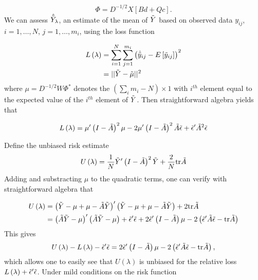 \begin{equation} 
\Phi = D^{-1/2} X \left[ Bd + Qc \right].
\end{equation}
\noindent
We can assess $\hat{\tilde{Y}}_\lambda$, an estimate of the mean of $\tilde{Y}$ based on observed data $y_{ij}$, $i = 1,\dots, N$, $j = 1,\dots, m_i$, using the loss function

\begin{align}
\begin{split}
L\left(\lambda\right) &= \sum_{i = 1}^N \sum_{j = 1}^{m_i} \left(\hat{\tilde{y}}_{ij} - E\left[\tilde{y}_{ij}\right] \right)^2\\
&= \vert \vert \tilde{Y} - \tilde{\mu} \vert \vert^2
\end{split}
\end{align}
\noindent
where $\mu = D^{-1/2}W \Phi^*$ denotes the $\left( \sum \limits_{i} m_i - N\right) \times 1$ with $i^{th}$ element equal to the expected value of the  $i^{th}$ element of $\tilde{Y}$.  Then straightforward algebra yields that 

\begin{align} 
L\left(\lambda\right) = \mu'\left( I - \tilde{A} \right)^2\mu - 2\mu'\left( I - \tilde{A} \right)^2 \tilde{A} \tilde{\epsilon} + \tilde{\epsilon}' \tilde{A}^2 \tilde{\epsilon}
\end{align}

Define the unbiased risk estimate
\begin{equation} 
U\left(\lambda\right) = \frac{1}{N}\tilde{Y}'\left( I - \tilde{A} \right)^2\tilde{Y} + \frac{2}{N}\mbox{tr}\tilde{A}
\end{equation}
 \noindent
Adding and substracting $\mu$ to the quadratic terms, one can verify with straightforward algebra that

\begin{align}
\begin{split}
U\left(\lambda\right) &= \left( \tilde{Y} - \mu + \mu - \tilde{A} \tilde{Y} \right)'\left( \tilde{Y} - \mu + \mu - \tilde{A} \tilde{Y} \right) + 2\mbox{tr}\tilde{A} \\
&= \left(\tilde{A} \tilde{Y} - \mu \right)'\left( \tilde{A} \tilde{Y} - \mu \right) + \tilde{\epsilon}'\tilde{\epsilon} + 2\tilde{\epsilon}' \left( I- \tilde{A}\right)\mu- 2\left( \tilde{\epsilon}'\tilde{A} \tilde{\epsilon} -  \mbox{tr}\tilde{A}\right)
\end{split}
\end{align}
\noindent
This gives
\begin{equation} 
U\left(\lambda\right) - L\left(\lambda\right) - \tilde{\epsilon}'\tilde{\epsilon}  =  2\tilde{\epsilon}' \left( I- \tilde{A}\right)\mu- 2\left( \tilde{\epsilon}'\tilde{A} \tilde{\epsilon} -  \mbox{tr}\tilde{A}\right), 
\end{equation}
 \noindent
 which allows one to easily see that $U\left(\lambda\right)$ is unbiased for the relative loss $L\left(\lambda\right) + \tilde{\epsilon}'\tilde{\epsilon}$.  Under mild conditions on the risk function
 
